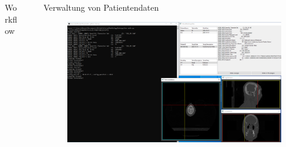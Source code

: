 \documentclass[final,hyperref={pdfpagelabels=false}]{beamer}
\begin{document}
\begin{frame}[t]
\begin{columns}[t]
\begin{column}{.465\textwidth}
\begin{block}{Workflow}
\end{block}

\end{column}


\begin{column}{.025\textwidth}\end{column} %

\begin{column}{0.465\textwidth}

\begin{block}{Verwaltung von Patientendaten}

    \begin{figure}
        \centering
        
        \includegraphics[width=1.0\textwidth]{pythonApplication01}
                
    \end{figure}
%
% 
    

\end{block}
\end{column}
\end{columns}
\end{frame}
\end{document}
